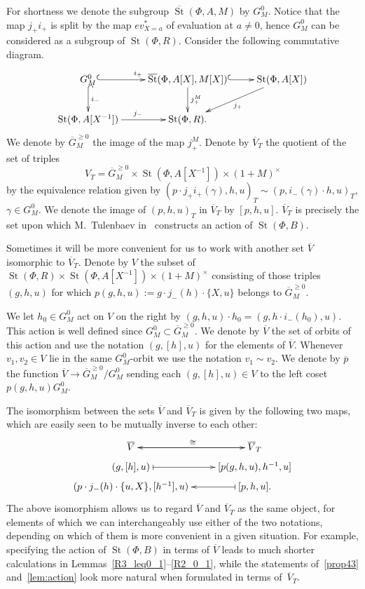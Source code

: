 \documentclass[oneside, 8pt]{amsart}
\theoremstyle{remark}
\theoremstyle{definition}
\numberwithin{lemma}{section}
\numberwithin{prop}{section}
\numberwithin{corollary}{section}
\numberwithin{externaltheorem}{section}
\DeclareMathOperator{\St}{St}
\newcommand{\inv}{^{-1}}
\numberwithin{equation}{section}
\begin{document}
For shortness we denote the subgroup $\overline{\St}(\Phi, A, M)$ by $G_M^0$.
Notice that the map $j_+i_+$ is split by the map $ev^*_{X=a}$ of evaluation at $a\neq 0$, hence $G_M^0$ can be considered as a subgroup of $\St(\Phi, R)$. Consider the following commutative diagram.
\[ \xymatrix{ G_M^0 \ar@{^{(}->}[r]^{i_+} \ar@{^{(}->}[d]^{i_-} & \overline{\St}(\Phi, A[X], M[X]) \ar^{j_+^M}[d] \ar@{^{(}->}[r] & \St(\Phi, A[X]) \ar[dl]^{j_+} \\
              \St(\Phi, A[X\inv]) \ar[r]^{j_-} & \St(\Phi, R). &  } \] 
We denote by $\overline{G}^{\geq 0}_M$ the image of the map $j_+^M$.               
Denote by $\overline{V}_T$ the quotient of the set of triples 
\[V_T = \overline{G}_M^{\geq 0} \times \St(\Phi, A[X\inv]) \times (1+M)^\times\] by the equivalence relation given by $(p \cdot j_+i_+(\gamma), h, u)_T \sim (p, i_-(\gamma) \cdot h, u)_T$, $\gamma \in G^0_M$. We denote the image of $(p, h, u)_T$ in $\overline{V}_T$ by $[p, h, u]$.
$\overline{V}_T$ is precisely the set upon which M.~Tulenbaev in~\cite[Proposition~4.3]{Tu83} constructs an action of $\St(\Phi, B)$.

Sometimes it will be more convenient for us to work with another set $\overline{V}$ isomorphic to $\overline{V}_T$. Denote by $V$ the subset of $\St(\Phi, R) \times \St(\Phi, A[X\inv]) \times (1 + M)^\times$ consisting of those triples $(g, h, u)$ for which $p(g, h, u) := g \cdot j_-(h) \cdot \{ X, u \}$ belongs to $\overline{G}_M^{\geq 0}$. 

We let $h_0 \in G_M^0$ act on $V$ on the right by $(g, h, u) \cdot h_0 = (g, h \cdot i_-(h_0), u)$. This action is well defined since $G^0_M \subset \overline{G}^{\geq 0}_M$.
We denote by $\overline{V}$ the set of orbits of this action and use the notation $(g, [h], u)$ for the elements of $\overline{V}$.
Whenever $v_1, v_2 \in V$ lie in the same $G_M^0$-orbit we use the notation $v_1 \sim v_2$.
We denote by $\overline{p}$ the function $\overline{V} \to \overline{G}^{\geq 0}_M/G_M^0$ sending each $(g, [h], u) \in V$ to the left coset $p(g, h, u)G_M^0$.

The isomorphism between the sets $\overline{V}$ and $\overline{V}_T$ is given by the following two maps, which are easily seen to be mutually inverse to each other:
\begin{equation} \label{eq:VVT} \xymatrix @R0.3pc {\overline{V} \ar[r]^{\cong} & \ar[l] \overline{V}_T \\ (g, [h], u) \ar@{|->}[r] & [p(g, h, u), h^{-1}, u] \\ (p \cdot j_-(h) \cdot \{u, X\}, [h^{-1}], u) & \ar@{|->}[l] [p, h, u]. } \end{equation}
The above isomorphism allows us to regard $\overline{V}$ and $\overline{V}_T$ as the same object, for elements of which we can interchangeably use either of the two notations,
 depending on which of them is more convenient in a given situation.
For example, specifying the action of $\St(\Phi, B)$ in terms of $\overline{V}$ leads to much shorter calculations in Lemmas~\ref{R3_leq0_1}--\ref{R2_0_1},
 while the statements of~\cref{prop43} and~\cref{lem:action} look more natural when formulated in terms of~$\overline{V}_T$.
\end{document}
